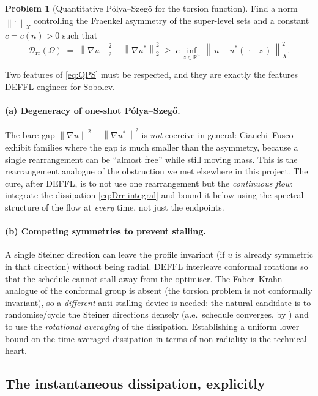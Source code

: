 \documentclass[11pt]{article}
\theoremstyle{definition}
\newtheorem{problem}[theorem]{Problem}
\newcommand{\R}{\mathbb R}
\newcommand{\Om}{\Omega}
\newcommand{\Drr}{\mathcal D_{\mathrm{rr}}}
\newcommand{\norm}[1]{\left\|#1\right\|}
\begin{document}
\begin{problem}[Quantitative Pólya--Szegő for the torsion function]\label{prob:QPS}
Find a norm $\norm{\cdot}_X$ controlling the Fraenkel asymmetry of the
super-level sets and a constant $c=c(n)>0$ such that
\begin{equation}\label{eq:QPS}
   \Drr(\Om)\;=\;\norm{\nabla u}_2^2-\norm{\nabla u^*}_2^2
   \;\ge\;c\,\inf_{z\in\R^n}\,\norm{\,u-u^*(\,\cdot-z\,)\,}_X^2 .
\end{equation}
\end{problem}

Two features of \eqref{eq:QPS} must be respected, and they are exactly the
features DEFFL engineer for Sobolev.

\paragraph{(a) Degeneracy of one-shot Pólya--Szegő.} The bare gap
$\norm{\nabla u}^2-\norm{\nabla u^*}^2$ is \emph{not} coercive in general:
Cianchi--Fusco exhibit families where the gap is much smaller than the
asymmetry, because a single rearrangement can be ``almost free'' while still
moving mass. This is the rearrangement analogue of the obstruction we met
elsewhere in this project. The cure, after DEFFL, is to not use one
rearrangement but the \emph{continuous flow}: integrate the dissipation
\eqref{eq:Drr-integral} and bound it below using the spectral structure of
the flow at \emph{every} time, not just the endpoints.

\paragraph{(b) Competing symmetries to prevent stalling.} A single Steiner
direction can leave the profile invariant (if $u$ is already symmetric in
that direction) without being radial. DEFFL interleave conformal rotations
so that the schedule cannot stall away from the optimiser. The Faber--Krahn
analogue of the conformal group is absent (the torsion problem is not
conformally invariant), so a \emph{different} anti-stalling device is needed:
the natural candidate is to randomise/cycle the Steiner directions densely
(a.e.\ schedule converges, by \cite{VanSchaftingen}) and to use the
\emph{rotational averaging} of the dissipation. Establishing a uniform
lower bound on the time-averaged dissipation in terms of non-radiality is the
technical heart.

\subsection{The instantaneous dissipation, explicitly}
\end{document}
